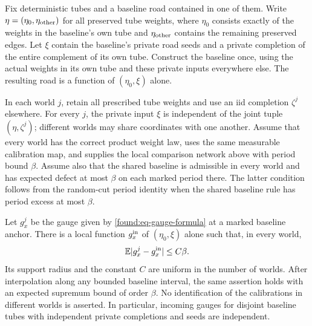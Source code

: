 \begin{lemma}
\label{found:lem-common-gauge}
Fix deterministic tubes and a baseline road contained in one of them.
Write $\eta=(\eta_0,\eta_{\rm other})$ for all preserved tube weights,
where $\eta_0$ consists exactly of the weights in the baseline's own
tube and $\eta_{\rm other}$ contains the remaining preserved edges.
Let $\xi$ contain the baseline's private road seeds and a private
completion of the entire complement of its own tube.  Construct the
baseline once, using the actual weights in its own tube and these
private inputs everywhere else.  The resulting road is a function of
$(\eta_0,\xi)$ alone.

In each world $j$, retain all prescribed tube weights and use an iid
completion $\zeta^j$ elsewhere.  For every $j$, the private input
$\xi$ is independent of the joint tuple $(\eta,\zeta^j)$; different
worlds may share coordinates with one another.  Assume that every world
has the correct product weight law, uses the same measurable
calibration map, and supplies the local comparison network above with
period bound $\beta$.  Assume also that the shared baseline is
admissible in every world and has expected defect at most $\beta$ on
each marked period there.  The latter condition follows from the
random-cut period identity when the shared baseline rule has period
excess at most $\beta$.

Let $g_x^j$ be the gauge given by \eqref{found:eq-gauge-formula} at a
marked baseline anchor.  There is a local function $g_x^{\rm in}$ of
$(\eta_0,\xi)$ alone such that, in every world,
\begin{equation}
 \mathbb E |g_x^j-g_x^{\rm in}|\leq C\beta.
                                                        \label{found:eq-common-gauge}
\end{equation}
Its support radius and the constant $C$ are uniform in the number of
worlds.  After interpolation along any bounded baseline interval,
the same assertion holds with an expected supremum bound of order
$\beta$.  No identification of the calibrations in different worlds
is asserted.  In particular, incoming gauges for disjoint baseline
tubes with independent private completions and seeds are independent.
\end{lemma}


